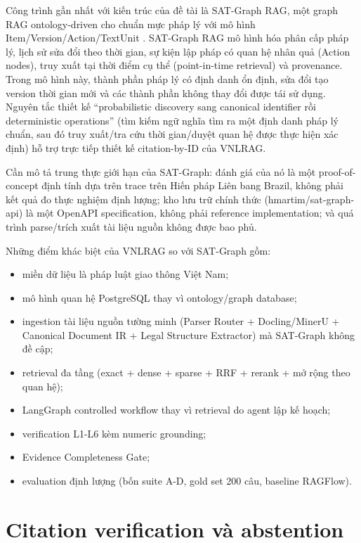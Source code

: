 \documentclass[a4paper,12pt]{extreport}
\begin{document}
\begin{sloppypar}
Công trình gần nhất với kiến trúc của đề tài là SAT-Graph RAG, một graph RAG ontology-driven cho chuẩn mực pháp lý với mô hình Item/Version/Action/TextUnit \cite{demartim2025satgraph}. SAT-Graph RAG mô hình hóa phân cấp pháp lý, lịch sử sửa đổi theo thời gian, sự kiện lập pháp có quan hệ nhân quả (Action nodes), truy xuất tại thời điểm cụ thể (point-in-time retrieval) và provenance. Trong mô hình này, thành phần pháp lý có định danh ổn định, sửa đổi tạo version thời gian mới và các thành phần không thay đổi được tái sử dụng. Nguyên tắc thiết kế ``probabilistic discovery sang canonical identifier rồi deterministic operations'' (tìm kiếm ngữ nghĩa tìm ra một định danh pháp lý chuẩn, sau đó truy xuất/tra cứu thời gian/duyệt quan hệ được thực hiện xác định) hỗ trợ trực tiếp thiết kế citation-by-ID của VNLRAG.
\end{sloppypar}

Cần mô tả trung thực giới hạn của SAT-Graph: đánh giá của nó là một proof-of-concept định tính dựa trên trace trên Hiến pháp Liên bang Brazil, không phải kết quả đo thực nghiệm định lượng; kho lưu trữ chính thức (hmartim/sat-graph-api) là một OpenAPI specification, không phải reference implementation; và quá trình parse/trích xuất tài liệu nguồn không được bao phủ.

Những điểm khác biệt của VNLRAG so với SAT-Graph gồm:

\begin{itemize}
  \item miền dữ liệu là pháp luật giao thông Việt Nam;
  \item mô hình quan hệ PostgreSQL thay vì ontology/graph database;
  \item ingestion tài liệu nguồn tường minh (Parser Router + Docling/MinerU + Canonical Document IR + Legal Structure Extractor) mà SAT-Graph không đề cập;
  \item retrieval đa tầng (exact + dense + sparse + RRF + rerank + mở rộng theo quan hệ);
  \item LangGraph controlled workflow thay vì retrieval do agent lập kế hoạch;
  \item verification L1-L6 kèm numeric grounding;
  \item Evidence Completeness Gate;
  \item evaluation định lượng (bốn suite A-D, gold set 200 câu, baseline RAGFlow).
\end{itemize}

\section{Citation verification và abstention}
\end{document}
